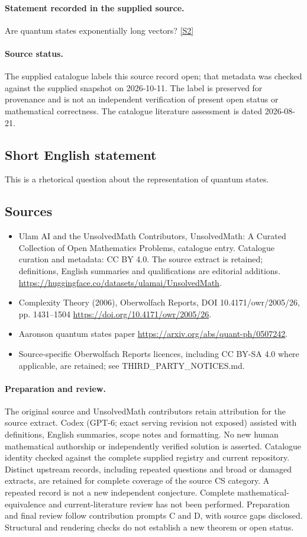 \documentclass[11pt]{article}
\newcommand{\sref}[2]{\hyperlink{source:#1:#2}{[S#2]}}
\begin{document}
\paragraph{Statement recorded in the supplied source.}
Are quantum states exponentially long vectors? \sref{statement}{2}
\paragraph{Source status.}
The supplied catalogue labels this source record open; that metadata was checked against the supplied snapshot on 2026-10-11. The label is preserved for provenance and is not an independent verification of present open status or mathematical correctness. The catalogue literature assessment is dated 2026-08-21.
\subsection{Short English statement}
This is a rhetorical question about the representation of quantum states.
\subsection{Sources}
\begin{itemize}
\item[\hypertarget{source:statement:1}{S1}] Ulam AI and the UnsolvedMath Contributors, UnsolvedMath: A Curated Collection of Open Mathematics Problems, catalogue entry. Catalogue curation and metadata: CC BY 4.0. The source extract is retained; definitions, English summaries and qualifications are editorial additions.
\url{https://huggingface.co/datasets/ulamai/UnsolvedMath}.
\item[\hypertarget{source:statement:2}{S2}] Complexity Theory (2006), Oberwolfach Reports, DOI 10.4171/owr/2005/26, pp. 1431--1504
\url{https://doi.org/10.4171/owr/2005/26}.
\item[\hypertarget{source:statement:3}{S3}] Aaronson quantum states paper
\url{https://arxiv.org/abs/quant-ph/0507242}.
\item Source-specific Oberwolfach Reports licences, including CC BY-SA 4.0 where applicable, are retained; see THIRD\_PARTY\_NOTICES.md.
\end{itemize}
\paragraph{Preparation and review.}
The original source and UnsolvedMath contributors retain attribution for the source extract. Codex (GPT-6; exact serving revision not exposed) assisted with definitions, English summaries, scope notes and formatting. No new human mathematical authorship or independently verified solution is asserted. Catalogue identity checked against the complete supplied registry and current repository. Distinct upstream records, including repeated questions and broad or damaged extracts, are retained for complete coverage of the source CS category. A repeated record is not a new independent conjecture. Complete mathematical-equivalence and current-literature review has not been performed. Preparation and final review follow contribution prompts C and D, with source gaps disclosed. Structural and rendering checks do not establish a new theorem or open status.
\label{end:statement}
\end{document}
